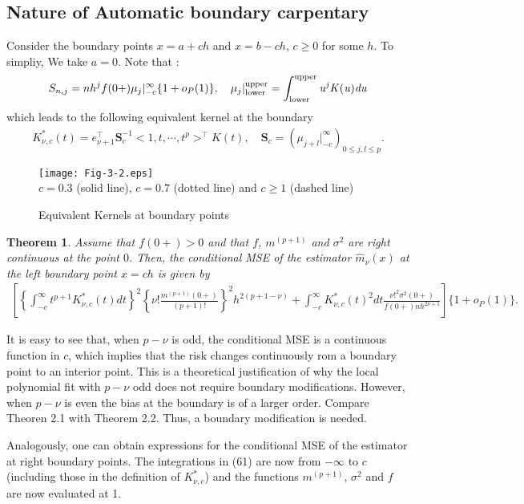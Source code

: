 \documentclass[12pt]{article}
\renewcommand{\=}[1]{\stackrel{#1}{=}} %
\newtheorem{thm}{Theorem}[section]
\theoremstyle{definition}
\begin{document}
\subsection{Nature of Automatic boundary carpentary}
	Consider the boundary points $x=a+ch$ and $x=b-ch$, $c\geq0$ for some $h$. To simpliy, We take $a=0$. 
	Note that :
	\begin{align}
	S_{n,j}=nh^{j}f(0+)\mu_{j}|_{-c}^{\infty}\{1+o_P(1)\},\quad\mu_{j}|\rm_{lower}^{upper}=\int_{lower}^{upper}\it u^jK(u)du
	\end{align}
	which leads to the following equivalent kernel at the boundary
	\begin{align}
	K^{*}_{\nu,c}(t)=e_{\nu+1}^{\top}\mathbf{S}_{c}^{-1}<1,t,\cdots,t^p>^{\top}K(t),\quad\mathbf{S}_{c}=(\mu_{j+l}|_{-c}^{\infty})_{0\leq j,l\leq p}.
	\end{align}
	\begin{figure}
		\caption{Equivalent Kernels at boundary points}
		\centering
		\texttt{[image: Fig-3-2.eps]}	
		\\ $c=0.3$ (solid line), $c=0.7$ (dotted line) and $c\geq1$ (dashed line)
	\end{figure}
	\begin{thm}
		Assume that $f(0+)>0$ and that $f$, $m^{(p+1)}$ and $\sigma^2$ are right continuous at the point $0$. Then, the conditional MSE of the estimator $\hat{m}_{\nu}(x)$ at the left boundary point $x=ch$ is given by
		\begin{align}
		\left[\left\{\int_{-c}^{\infty}t^{p+1}K^*_{\nu,c}(t)dt\right\}^2\left\{\nu!\frac{m^{(p+1)}(0+)}{(p+1)!}\right\}^2h^{2(p+1-\nu)}+\int_{-c}^{\infty}K^*_{\nu,c}(t)^2dt\frac{\nu!^2\sigma^2(0+)}{f(0+)nh^{2\nu+1}}\right]\{1+o_P(1)\}.
		\end{align}
	\end{thm}
	It is easy to see that, when $p - \nu$ is odd, the conditional MSE is a continuous function in $c$, which implies that the risk changes continuously rom a boundary point to an interior point. This is a theoretical justification of why the local polynomial fit with $p - \nu$ odd does not require boundary modifications. However, when $p - \nu$ is even the bias at the boundary is of a larger order. Compare Theoren 2.1 with Theorem 2.2. Thus, a boundary modification is needed.
	
	Analogously, one can obtain expressions for the conditional MSE of the estimator at right boundary points. The integrations in (61) are now from $-\infty$ to $c$ (including those in the definition of $K^*_{\nu,c}$) and the functions $m^{(p+1)}$, $\sigma^2$ and $f$ are now evaluated at 1.
	
\end{document}
